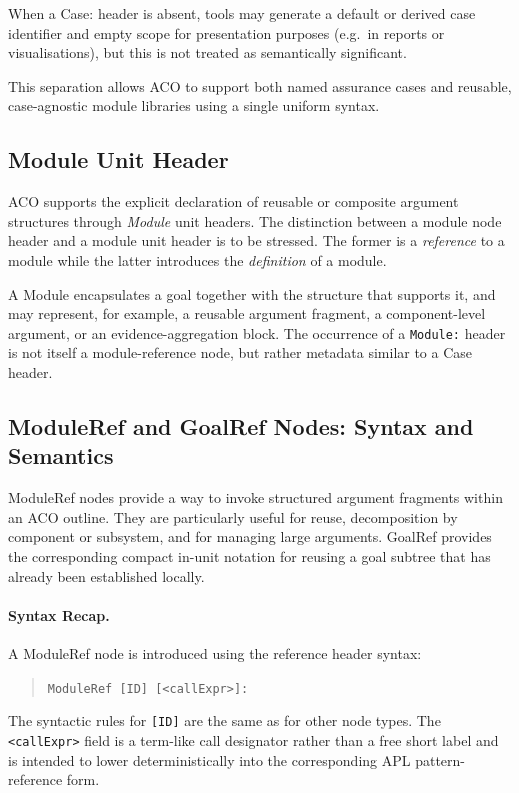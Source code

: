 \documentclass[11pt,twoside,a4paper]{article}
\begin{document}
When a Case: header is absent, tools may generate a default or derived case identifier and empty scope
for presentation purposes (e.g.\ in reports or visualisations), but this is not
treated as semantically significant.

This separation allows ACO to support both named assurance cases and reusable,
case-agnostic module libraries using a single uniform syntax.

\subsection{Module Unit Header}

ACO supports the explicit declaration of reusable or composite argument structures through
\emph{Module} unit headers.
The distinction between a module node header and a module unit header is to be stressed. The former is a \emph{reference} to a module while the latter introduces the \emph{definition} of a module.

A Module encapsulates a goal together with the structure that supports it,
and may represent, for example, a reusable argument fragment, a component-level argument,
or an evidence-aggregation block.
The occurrence of a \texttt{Module:} header is not itself a module-reference node, but rather metadata similar to a Case header.
%

\subsection{ModuleRef and GoalRef Nodes: Syntax and Semantics}
\label{sec:module-semantics}

ModuleRef nodes provide a way to invoke structured argument fragments within an
ACO outline. They are particularly useful for reuse, decomposition by component or subsystem,
and for managing large arguments. GoalRef provides the corresponding compact in-unit notation for reusing a goal subtree that has already been established locally.

\paragraph{Syntax Recap.}
A ModuleRef node is introduced using the reference header syntax:
\begin{quote}
\texttt{ModuleRef [ID] [<callExpr>]:}
\end{quote}
The syntactic rules for \texttt{[ID]} are the same as for other node types. The \texttt{<callExpr>} field is a term-like call designator rather than a free short label and is intended to lower deterministically into the corresponding APL pattern-reference form.
\end{document}
